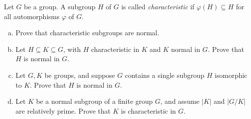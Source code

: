 \documentclass[10pt]{mypackage}
\begin{document}
\begin{exercise}
  Let $G$ be a group. A subgroup $H$ of $G$ is called \textit{characteristic} if $\varphi\left( H \right) \subseteq H$ for all automorphisms $\varphi$ of $G$.
  \begin{enumerate}[(a)]
    \item Prove that characteristic subgroups are normal.
    \item Let $H\subseteq K \subseteq G$, with $H$ characteristic in $K$ and $K$ normal in $G$. Prove that $H$ is normal in $G$.
    \item Let $G,K$ be groups, and suppose $G$ contains a single subgroup $H$ isomorphic to $K$. Prove that $H$ is normal in $G$.
    \item Let $K$ be a normal subgroup of a finite  group $G$, and assume $\left\vert K \right\vert$ and $\left\vert G/K \right\vert$ are relatively prime. Prove that $K$ is characteristic in $G$.
  \end{enumerate}
\end{exercise}
\end{document}
